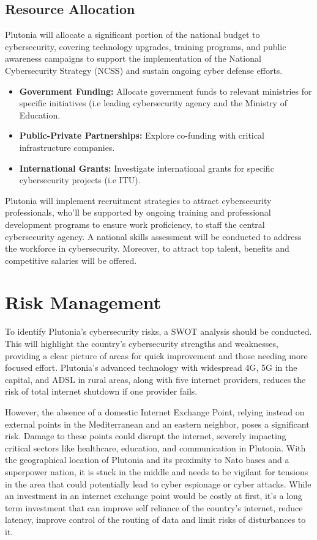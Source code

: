 \documentclass[
	a4paper, %
	10pt, %
]{CSSullivanBusinessReport}
\begin{document}
\begin{fullwidth}
\begin{justify}
\subsection{Resource Allocation}
Plutonia will allocate a significant portion of the national budget to cybersecurity, covering technology upgrades, training programs, and public awareness campaigns to support the implementation of the National Cybersecurity Strategy (NCSS) and sustain ongoing cyber defense efforts. 
\begin{itemize}
	\item \textbf{Government Funding:} Allocate government funds to relevant ministries for specific initiatives (i.e leading cybersecurity agency and the Ministry of Education.
	\item \textbf{Public-Private Partnerships:} Explore co-funding with critical infrastructure companies.
	\item \textbf{International Grants:} Investigate international grants for specific cybersecurity projects (i.e ITU).
\end{itemize}
Plutonia will implement recruitment strategies to attract cybersecurity professionals, who’ll be supported by ongoing training and professional development programs to ensure work proficiency, to staff the central cybersecurity agency. A national skills assessment will be conducted to address the workforce in cybersecurity. Moreover, to attract top talent, benefits and competitive salaries will be offered. 

\section{Risk Management}
To identify Plutonia's cybersecurity risks, a SWOT analysis should be conducted. This will highlight the country's cybersecurity strengths and weaknesses, providing a clear picture of areas for quick improvement and those needing more focused effort. Plutonia's advanced technology with widespread 4G, 5G in the capital, and ADSL in rural areas, along with five internet providers, reduces the risk of total internet shutdown if one provider fails. 

However, the absence of a domestic Internet Exchange Point, relying instead on external points in the Mediterranean and an eastern neighbor, poses a significant risk. Damage to these points could disrupt the internet, severely impacting critical sectors like healthcare, education, and communication in Plutonia. With the geographical location of Plutonia and its proximity to Nato bases and a superpower nation, it is stuck in the middle and needs to be vigilant for tensions in the area that could potentially lead to cyber espionage or cyber attacks. While an investment in an internet exchange point would be costly at first, it's a long term investment that can improve self reliance of the country's internet, reduce latency, improve control of the routing of data and limit risks of disturbances to it.  


\end{justify}
\end{fullwidth}
\end{document}
